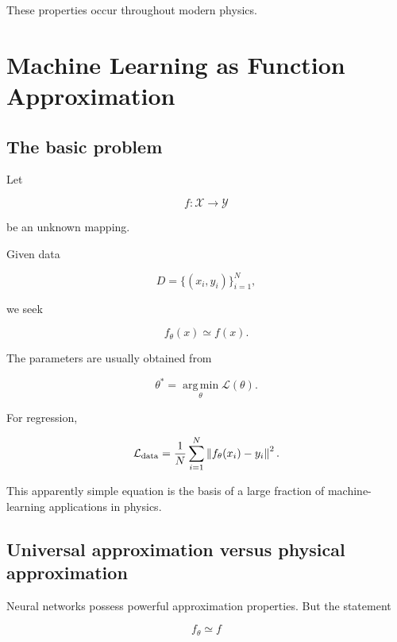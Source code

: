 \documentclass[11pt,a4paper,oneside]{book}
\newcommand{\Loss}{\mathcal{L}}
\begin{document}
These properties occur throughout modern physics.

\chapter{Machine Learning as Function Approximation}

\section{The basic problem}

Let

\begin{equation}
f:\mathcal{X}\rightarrow\mathcal{Y}
\end{equation}

be an unknown mapping.

Given data

\begin{equation}
D=
\{(x_i,y_i)\}_{i=1}^N,
\end{equation}

we seek

\begin{equation}
f_\theta(x)\simeq f(x).
\end{equation}

The parameters are usually obtained from

\begin{equation}
\theta^\ast
=
\operatorname*{arg\,min}_{\theta}
\Loss(\theta).
\end{equation}

For regression,

\begin{equation}
\Loss_{\rm data}
=
\frac{1}{N}
\sum_{i=1}^N
\left\|
f_\theta(x_i)-y_i
\right\|^2.
\end{equation}

This apparently simple equation is the basis of a large fraction of
machine-learning applications in physics.

\section{Universal approximation versus physical approximation}

Neural networks possess powerful approximation properties. But the statement

\begin{equation}
f_\theta\simeq f
\end{equation}
\end{document}

